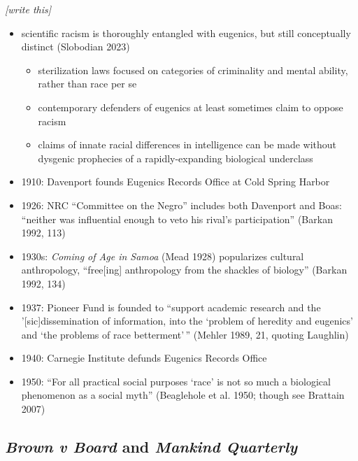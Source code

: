 \documentclass[12pt]{article}
\providecommand{\tightlist}{%
  \setlength{\itemsep}{0pt}\setlength{\parskip}{0pt}}
\begin{document}
\emph{{[}write this{]}}

\begin{itemize}
\tightlist
\item
  scientific racism is thoroughly entangled with eugenics, but still conceptually distinct (Slobodian 2023)

  \begin{itemize}
  \tightlist
  \item
    sterilization laws focused on categories of criminality and mental ability, rather than race per se
  \item
    contemporary defenders of eugenics at least sometimes claim to oppose racism
  \item
    claims of innate racial differences in intelligence can be made without dysgenic prophecies of a rapidly-expanding biological underclass
  \end{itemize}
\item
  1910: Davenport founds Eugenics Records Office at Cold Spring Harbor
\item
  1926: NRC ``Committee on the Negro'' includes both Davenport and Boas: ``neither was influential enough to veto his rival's participation'' (Barkan 1992, 113)
\item
  1930s: \emph{Coming of Age in Samoa} (Mead 1928) popularizes cultural anthropology, ``free{[}ing{]} anthropology from the shackles of biology'' (Barkan 1992, 134)
\item
  1937: Pioneer Fund is founded to ``support academic research and the '{[}sic{]}dissemination of information, into the `problem of heredity and eugenics' and `the problems of race betterment'\,'' (Mehler 1989, 21, quoting Laughlin)
\item
  1940: Carnegie Institute defunds Eugenics Records Office
\item
  1950: ``For all practical social purposes `race' is not so much a biological phenomenon as a social myth'' (Beaglehole et al. 1950; though see Brattain 2007)
\end{itemize}

\hypertarget{brown-v-board-and-mankind-quarterly}{%
\subsection*{\texorpdfstring{\emph{Brown v Board} and \emph{Mankind Quarterly}}{Brown v Board and Mankind Quarterly}}\label{brown-v-board-and-mankind-quarterly}}
\end{document}
